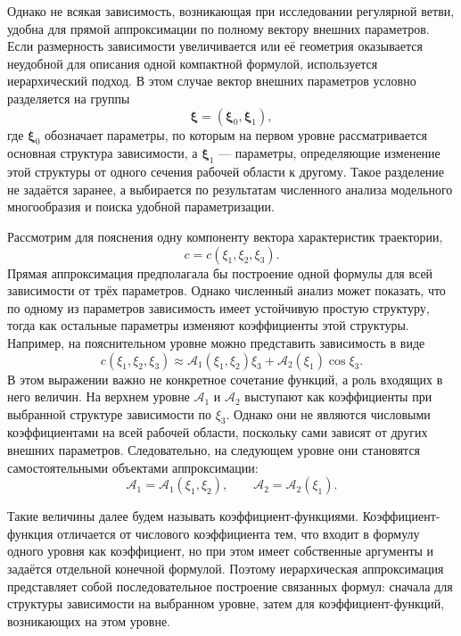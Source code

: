 Однако не всякая зависимость, возникающая при исследовании регулярной ветви, удобна для прямой аппроксимации по полному вектору внешних параметров. Если размерность зависимости увеличивается или её геометрия оказывается неудобной для описания одной компактной формулой, используется иерархический подход. В этом случае вектор внешних параметров условно разделяется на группы
\begin{equation}
	\boldsymbol\xi=
	\left(
	\boldsymbol\xi_0,\boldsymbol\xi_1
	\right),
\end{equation}
где \(\boldsymbol\xi_0\) обозначает параметры, по которым на первом уровне рассматривается основная структура зависимости, а \(\boldsymbol\xi_1\) --- параметры, определяющие изменение этой структуры от одного сечения рабочей области к другому. Такое разделение не задаётся заранее, а выбирается по результатам численного анализа модельного многообразия и поиска удобной параметризации.

Рассмотрим для пояснения одну компоненту вектора характеристик траектории,
\begin{equation}
	c=c(\xi_1,\xi_2,\xi_3).
\end{equation}
Прямая аппроксимация предполагала бы построение одной формулы для всей зависимости от трёх параметров. Однако численный анализ может показать, что по одному из параметров зависимость имеет устойчивую простую структуру, тогда как остальные параметры изменяют коэффициенты этой структуры. Например, на пояснительном уровне можно представить зависимость в виде
\begin{equation}
	c(\xi_1,\xi_2,\xi_3)
	\approx
	\mathcal A_1(\xi_1,\xi_2)\xi_3
	+
	\mathcal A_2(\xi_1)\cos\xi_3 .
\end{equation}
В этом выражении важно не конкретное сочетание функций, а роль входящих в него величин. На верхнем уровне \(\mathcal A_1\) и \(\mathcal A_2\) выступают как коэффициенты при выбранной структуре зависимости по \(\xi_3\). Однако они не являются числовыми коэффициентами на всей рабочей области, поскольку сами зависят от других внешних параметров. Следовательно, на следующем уровне они становятся самостоятельными объектами аппроксимации:
\begin{equation}
	\mathcal A_1=\mathcal A_1(\xi_1,\xi_2),
	\qquad
	\mathcal A_2=\mathcal A_2(\xi_1).
\end{equation}

Такие величины далее будем называть коэффициент-функциями. Коэффициент-функция отличается от числового коэффициента тем, что входит в формулу одного уровня как коэффициент, но при этом имеет собственные аргументы и задаётся отдельной конечной формулой. Поэтому иерархическая аппроксимация представляет собой последовательное построение связанных формул: сначала для структуры зависимости на выбранном уровне, затем для коэффициент-функций, возникающих на этом уровне.

